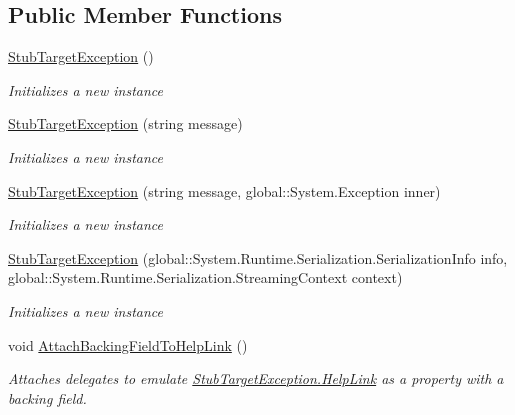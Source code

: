 \subsection*{Public Member Functions}
\begin{DoxyCompactItemize}
\item 
\hyperlink{class_system_1_1_reflection_1_1_fakes_1_1_stub_target_exception_a6b073c5f21ca22300f21af84ff350c3f}{Stub\-Target\-Exception} ()
\begin{DoxyCompactList}\small\item\em Initializes a new instance\end{DoxyCompactList}\item 
\hyperlink{class_system_1_1_reflection_1_1_fakes_1_1_stub_target_exception_a8c3a23e7a6fa89f602f13933d55172c4}{Stub\-Target\-Exception} (string message)
\begin{DoxyCompactList}\small\item\em Initializes a new instance\end{DoxyCompactList}\item 
\hyperlink{class_system_1_1_reflection_1_1_fakes_1_1_stub_target_exception_adee4af1baf17b278ee599ff6d866dadc}{Stub\-Target\-Exception} (string message, global\-::\-System.\-Exception inner)
\begin{DoxyCompactList}\small\item\em Initializes a new instance\end{DoxyCompactList}\item 
\hyperlink{class_system_1_1_reflection_1_1_fakes_1_1_stub_target_exception_a42da4faba33fad784466fa952f5f6dc9}{Stub\-Target\-Exception} (global\-::\-System.\-Runtime.\-Serialization.\-Serialization\-Info info, global\-::\-System.\-Runtime.\-Serialization.\-Streaming\-Context context)
\begin{DoxyCompactList}\small\item\em Initializes a new instance\end{DoxyCompactList}\item 
void \hyperlink{class_system_1_1_reflection_1_1_fakes_1_1_stub_target_exception_adb40bf86eb14e615c6506865f7b4c39a}{Attach\-Backing\-Field\-To\-Help\-Link} ()
\begin{DoxyCompactList}\small\item\em Attaches delegates to emulate \hyperlink{class_system_1_1_reflection_1_1_fakes_1_1_stub_target_exception_ac9ed8e0c8958ae73f970defceb621bc3}{Stub\-Target\-Exception.\-Help\-Link} as a property with a backing field.\end{DoxyCompactList}\item 

\end{DoxyCompactItemize}
